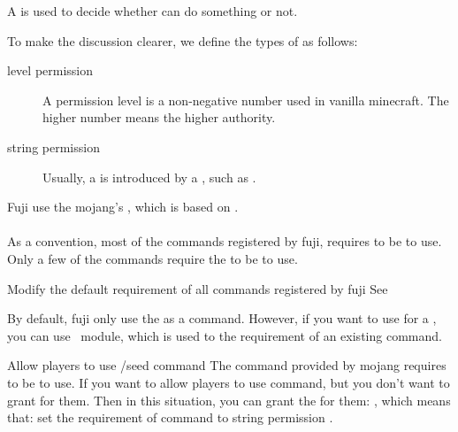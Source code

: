 \label{ch:permission}
A  is used to decide whether  can do something or not.


To make the discussion clearer, we define the types of  as follows:
\begin{description}
    \item [level permission] A permission level is a non-negative number used in vanilla minecraft.
    The higher number means the higher authority.
    \item[string permission] Usually, a  is introduced by a , such as .
\end{description}

\clearpage



Fuji use the mojang's , which is based on .\\
\\
As a convention, most of the commands registered by fuji, requires  to be  to use.
Only a few of the commands require the  to be  to use.
\begin{tips}{Modify the default requirement of all commands registered by fuji}
    See~
\end{tips}

By default, fuji only use the  as  a command.
However, if you want to use  for a , you can use~ module, which is used to  the requirement of an existing command.

\begin{example}{Allow players to use /seed command}
    The command  provided by mojang requires  to be  to use.
    If you want to allow players to use  command, but you don't want to grant  for them.
    Then in this situation, you can grant the  for them: , which means that: set the requirement of command  to string permission .
\end{example}

